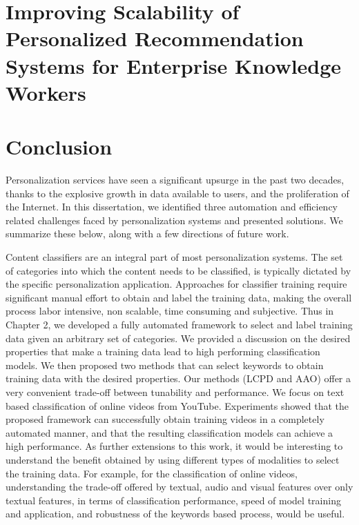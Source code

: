 \documentclass[12pt]{ucsddissertation}
\begin{document}
\chapter{Improving Scalability of Personalized Recommendation Systems for Enterprise Knowledge Workers}



\chapter{Conclusion}

Personalization services have seen a significant upsurge in the past two decades, thanks to the explosive growth in data available to users, and the proliferation of the Internet. In this dissertation, we identified three automation and efficiency related challenges faced by personalization systems and presented solutions. We summarize these below, along with a few directions of future work. 


Content classifiers are an integral part of most personalization systems. The set of categories into which the content needs to be classified, is typically dictated by the specific personalization application. Approaches for classifier training require significant manual effort to obtain and label the training data, making the overall process labor intensive, non scalable, time consuming and subjective. Thus in Chapter 2, we developed a fully automated framework to select and label training data given an arbitrary set of categories. We provided a discussion on the desired properties that make a training data lead to high performing classification models. We then proposed two methods that can select keywords to obtain training data with the desired properties. Our methods (LCPD and AAO) offer a very convenient trade-off between tunability and performance. We focus on text based classification of online videos from YouTube. Experiments showed that the proposed framework can successfully obtain training videos in a completely automated manner, and that the resulting classification models can achieve a high performance. 
As further extensions to this work, it would be interesting to understand the benefit obtained by using different types of modalities to select the training data. For example, for the classification of online videos, understanding the trade-off offered by textual, audio and visual features over only textual features, in terms of classification performance, speed of model training and application, and robustness of the keywords based process, would be useful. 
\end{document}
